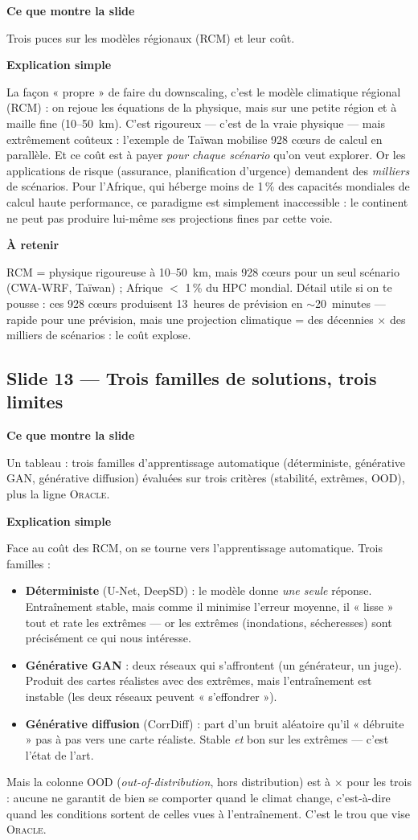 \documentclass[11pt,a4paper]{article}
\newcommand{\slide}[2]{\subsection*{\textcolor{bleu}{Slide #1 --- #2}}}
\newcommand{\bloc}[1]{\par\medskip\noindent\textcolor{accent}{\textbf{#1}}\par\nopagebreak\smallskip}
\begin{document}
\bloc{Ce que montre la slide}
Trois puces sur les modèles régionaux (RCM) et leur coût.

\bloc{Explication simple}
La façon « propre » de faire du downscaling, c'est le modèle climatique régional (RCM) : on rejoue les équations de la physique, mais sur une petite région et à maille fine (10--50~km). C'est rigoureux --- c'est de la vraie physique --- mais extrêmement coûteux : l'exemple de Taïwan mobilise 928 c\oe urs de calcul en parallèle. Et ce coût est à payer \emph{pour chaque scénario} qu'on veut explorer. Or les applications de risque (assurance, planification d'urgence) demandent des \emph{milliers} de scénarios. Pour l'Afrique, qui héberge moins de 1\,\% des capacités mondiales de calcul haute performance, ce paradigme est simplement inaccessible : le continent ne peut pas produire lui-même ses projections fines par cette voie.

\bloc{À retenir}
RCM = physique rigoureuse à 10--50~km, mais 928 c\oe urs pour un seul scénario (CWA-WRF, Taïwan) ; Afrique $<$ 1\,\% du HPC mondial. Détail utile si on te pousse : ces 928 c\oe urs produisent 13~heures de prévision en $\sim$20~minutes --- rapide pour une prévision, mais une projection climatique = des décennies $\times$ des milliers de scénarios : le coût explose.

\slide{13}{Trois familles de solutions, trois limites}

\bloc{Ce que montre la slide}
Un tableau : trois familles d'apprentissage automatique (déterministe, générative GAN, générative diffusion) évaluées sur trois critères (stabilité, extrêmes, OOD), plus la ligne \textsc{Oracle}.

\bloc{Explication simple}
Face au coût des RCM, on se tourne vers l'apprentissage automatique. Trois familles :
\begin{itemize}[nosep]
  \item \textbf{Déterministe} (U-Net, DeepSD) : le modèle donne \emph{une seule} réponse. Entraînement stable, mais comme il minimise l'erreur moyenne, il « lisse » tout et rate les extrêmes --- or les extrêmes (inondations, sécheresses) sont précisément ce qui nous intéresse.
  \item \textbf{Générative GAN} : deux réseaux qui s'affrontent (un générateur, un juge). Produit des cartes réalistes avec des extrêmes, mais l'entraînement est instable (les deux réseaux peuvent « s'effondrer »).
  \item \textbf{Générative diffusion} (CorrDiff) : part d'un bruit aléatoire qu'il « débruite » pas à pas vers une carte réaliste. Stable \emph{et} bon sur les extrêmes --- c'est l'état de l'art.
\end{itemize}
Mais la colonne OOD (\emph{out-of-distribution}, hors distribution) est à $\times$ pour les trois : aucune ne garantit de bien se comporter quand le climat change, c'est-à-dire quand les conditions sortent de celles vues à l'entraînement. C'est le trou que vise \textsc{Oracle}.
\end{document}
